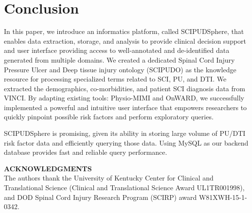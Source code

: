 \documentclass{amia}
\begin{document}
\section{Conclusion}
In this paper, we introduce an informatics platform, called SCIPUDSphere, that enables data extraction, storage, and analysis to provide clinical decision support and user interface providing access to well-annotated and de-identified data generated from multiple domains. We created a dedicated Spinal Cord Injury Pressure Ulcer and Deep tissue injury ontology (SCIPUDO) as the knowledge resource for processing specialized terms related to SCI, PU, and DTI. We extracted the demographics, co-morbidities, and patient SCI diagnosis data from VINCI. By adapting existing tools: Physio-MIMI and OnWARD, we successfully implemented a powerful and intuitive user interface that empowers researchers to quickly pinpoint possible risk factors and perform exploratory queries.

SCIPUDSphere is promising, given its ability in storing large volume of PU/DTI risk factor data and efficiently querying those data. Using MySQL as our backend database provides fast and reliable query performance.


\textbf{ACKNOWLEDGMENTS}\\
The authors thank the University of Kentucky Center for Clinical and Translational Science (Clinical and Translational Science Award UL1TR001998), and DOD Spinal Cord Injury Research Program (SCIRP) award W81XWH-15-1-0342.

\makeatletter
\renewcommand{\@biblabel}[1]{\hfill #1.}
\makeatother
\end{document}
